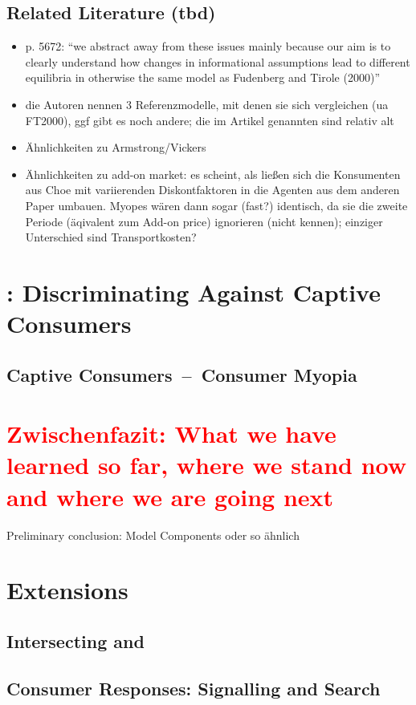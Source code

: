 \documentclass[a4paper, 11 pt, fleqn]{article}
\begin{document}
\subsection{Related Literature (tbd)}
\begin{itemize}
	\item p. 5672: ``we abstract away from these issues mainly because our aim is to clearly understand how changes in informational assumptions lead to different equilibria
	in otherwise the same model as Fudenberg and Tirole (2000)''
	\item die Autoren nennen 3 Referenzmodelle, mit denen sie sich vergleichen (ua FT2000), ggf gibt es noch andere; die im Artikel genannten sind relativ alt
	\item Ähnlichkeiten zu Armstrong/Vickers
	\item Ähnlichkeiten zu add-on market: es scheint, als ließen sich die Konsumenten aus Choe mit variierenden Diskontfaktoren in die Agenten aus dem anderen Paper umbauen. Myopes wären dann sogar (fast?) identisch, da sie die zweite Periode (äqivalent zum Add-on price) ignorieren (nicht kennen); einziger Unterschied sind Transportkosten?
\end{itemize}
%
\section{\citet{Armstrong.2019}: Discriminating Against Captive Consumers}
%
\subsection{Captive Consumers~--~Consumer Myopia}
%
\section{\textcolor{red}{Zwischenfazit: What we have learned so far, where we stand now and where we are going next}}
Preliminary conclusion: Model Components oder so ähnlich
%
\section{Extensions} \label{sec:extensions}
%
\subsection{Intersecting \citet{Choe.2018} and \citet{Armstrong.2019}}
%
\subsection{Consumer Responses: Signalling and Search}
%
\end{document}
